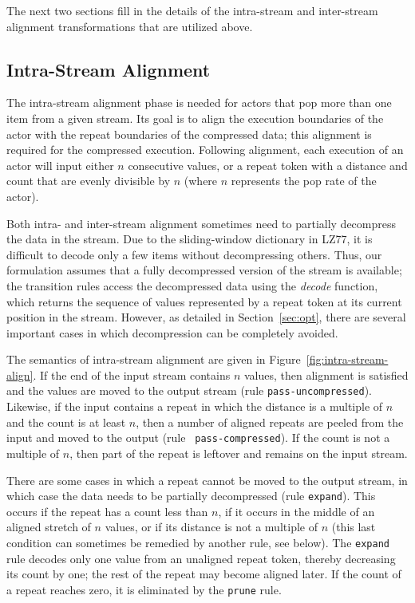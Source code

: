 The next two sections fill in the details of the intra-stream and
inter-stream alignment transformations that are utilized above.

\subsection{Intra-Stream Alignment}

The intra-stream alignment phase is needed for actors that pop more
than one item from a given stream.  Its goal is to align the execution
boundaries of the actor with the repeat boundaries of the compressed
data; this alignment is required for the compressed execution.
Following alignment, each execution of an actor will input either $n$
consecutive values, or a repeat token with a distance and count that
are evenly divisible by $n$ (where $n$ represents the pop rate of the
actor).

Both intra- and inter-stream alignment sometimes need to partially
decompress the data in the stream.  Due to the sliding-window
dictionary in LZ77, it is difficult to decode only a few items without
decompressing others.  Thus, our formulation assumes that a fully
decompressed version of the stream is available; the transition rules
access the decompressed data using the \mbox{\it decode} function,
which returns the sequence of values represented by a repeat token at
its current position in the stream.  However, as detailed in
Section~\ref{sec:opt}, there are several important cases in which
decompression can be completely avoided.

The semantics of intra-stream alignment are given in
Figure~\ref{fig:intra-stream-align}.  If the end of the input stream
contains $n$ values, then alignment is satisfied and the values are
moved to the output stream (rule {\tt pass-uncompressed}).  Likewise,
if the input contains a repeat in which the distance is a multiple of
$n$ and the count is at least $n$, then a number of aligned repeats
are peeled from the input and moved to the output (rule {\tt
pass-compressed}).  If the count is not a multiple of $n$, then part
of the repeat is leftover and remains on the input stream.

There are some cases in which a repeat cannot be moved to the output
stream, in which case the data needs to be partially decompressed
(rule {\tt expand}).  This occurs if the repeat has a count less than
$n$, if it occurs in the middle of an aligned stretch of $n$ values,
or if its distance is not a multiple of $n$ (this last condition can
sometimes be remedied by another rule, see below).  The {\tt expand}
rule decodes only one value from an unaligned repeat token, thereby
decreasing its count by one; the rest of the repeat may become aligned
later.  If the count of a repeat reaches zero, it is eliminated by the
{\tt prune} rule.

